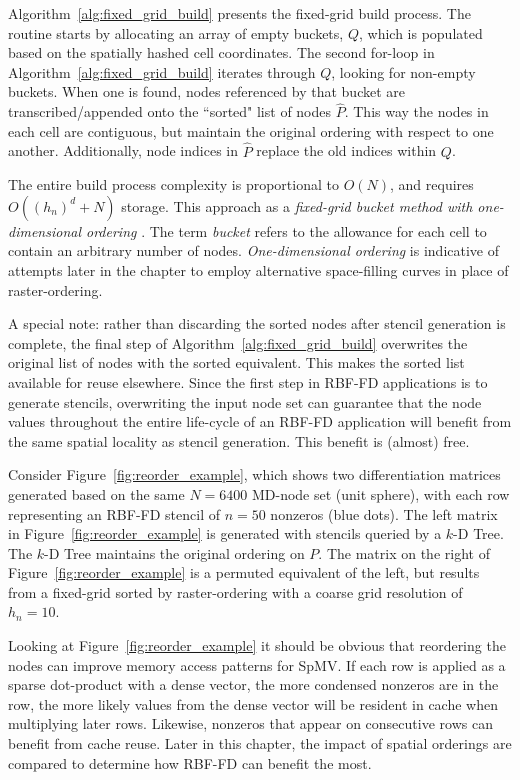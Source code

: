 \documentclass{report}
\begin{document}
Algorithm~\ref{alg:fixed_grid_build} presents the fixed-grid build process. The routine starts by allocating an array of empty buckets, $Q$, which is populated based on the spatially hashed cell coordinates. The second for-loop in Algorithm~\ref{alg:fixed_grid_build} iterates through $Q$, looking for non-empty buckets. When one is found, nodes referenced by that bucket are transcribed/appended onto the ``sorted" list of nodes $\hat{P}$. This way the nodes in each cell are contiguous, but maintain the original ordering with respect to one another. Additionally, node indices in $\hat{P}$ replace the old indices within $Q$.

The entire build process complexity is proportional to $O(N)$, and requires $O((h_n)^d + N)$ storage. This approach as a \emph{fixed-grid bucket method with one-dimensional ordering} \cite{Samet2005}. The term \emph{bucket} refers to the allowance for each cell to contain an arbitrary number of nodes. \emph{One-dimensional ordering} is indicative of attempts later in the chapter to employ alternative space-filling curves in place of raster-ordering. 

A special note: rather than discarding the sorted nodes after stencil generation is complete, the final step of Algorithm~\ref{alg:fixed_grid_build} overwrites the original list of nodes with the sorted equivalent. This makes the sorted list available for reuse elsewhere. Since the first step in RBF-FD applications is to generate stencils, overwriting the input node set can guarantee that the node values throughout the entire life-cycle of an RBF-FD application will benefit from the same spatial locality as stencil generation. This benefit is (almost) free. 

Consider Figure~\ref{fig:reorder_example}, which shows two differentiation matrices generated based on the same $N=6400$ MD-node set (unit sphere), with each row representing an RBF-FD stencil of $n=50$ nonzeros (blue dots). The left matrix in Figure~\ref{fig:reorder_example} is generated with stencils queried by a $k$-D Tree. The $k$-D Tree maintains the original ordering on $P$. The matrix on the right of Figure~\ref{fig:reorder_example} is a permuted equivalent of the left, but results from a fixed-grid sorted by raster-ordering with a coarse grid resolution of $h_n = 10$. 

Looking at Figure~\ref{fig:reorder_example} it should be obvious that reordering the nodes can improve memory access patterns for SpMV. If each row is applied as a sparse dot-product with a dense vector, the more condensed nonzeros are in the row, the more likely values from the dense vector will be resident in cache when multiplying later rows. Likewise, nonzeros that appear on consecutive rows can benefit from cache reuse. Later in this chapter, the impact of spatial orderings are compared to determine how RBF-FD can benefit the most. 
\end{document}
